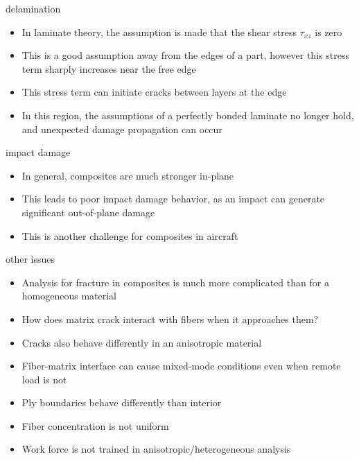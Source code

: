 \documentclass[10pt]{beamer}
\begin{document}
	\begin{frame}{delamination}
		\begin{itemize}[<+->]
			\item In laminate theory, the assumption is made that the shear stress $\tau_{xz}$ is zero
			\item This is a good assumption away from the edges of a part, however this stress term sharply increases near the free edge
			\item This stress term can initiate cracks between layers at the edge
			\item In this region, the assumptions of a perfectly bonded laminate no longer hold, and unexpected damage propagation can occur
		\end{itemize}
	\end{frame}
	
	\begin{frame}{impact damage}
		\begin{itemize}[<+->]
			\item In general, composites are much stronger in-plane
			\item This leads to poor impact damage behavior, as an impact can generate significant out-of-plane damage
			\item This is another challenge for composites in aircraft
		\end{itemize}
	\end{frame}
	
	\begin{frame}{other issues}
		\begin{itemize}[<+->]
			\item Analysis for fracture in composites is much more complicated than for a homogeneous material
			\item How does matrix crack interact with fibers when it approaches them?
			\item Cracks also behave differently in an anisotropic material
			\item Fiber-matrix interface can cause mixed-mode conditions even when remote load is not
			\item Ply boundaries behave differently than interior
			\item Fiber concentration is not uniform
			\item Work force is not trained in anisotropic/heterogeneous analysis
		\end{itemize}
	\end{frame}
	
\end{document}
